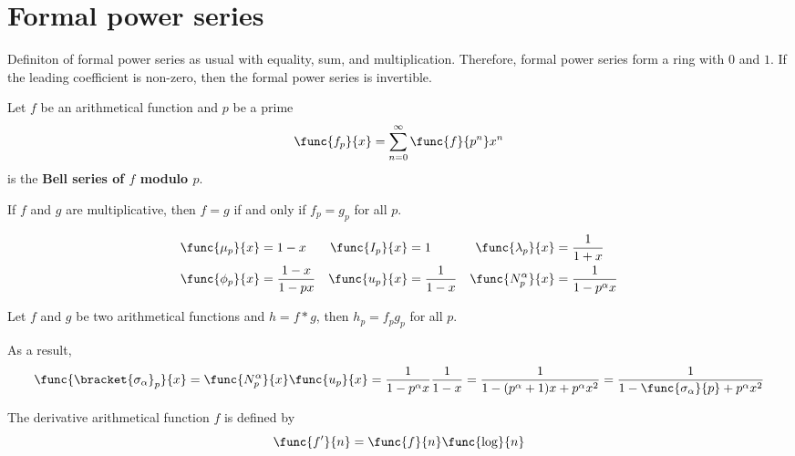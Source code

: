 \section{Formal power series}
Definiton of formal power series as usual with equality, sum, and multiplication. Therefore, formal power series form a ring with \(0\) and \(1\). If the leading coefficient is non-zero, then the formal power series is invertible. 
\begin{definition}
    Let \(f\) be an arithmetical function and \(p\) be a prime 
    \begin{equation*}
        \func{f_p}{x} = \sum_{n = 0}^{\infty} \func{f}{p^n}x^n
    \end{equation*}
    is the \textbf{Bell series of \(f\) modulo \(p\)}.
\end{definition}

\begin{theorem}
    If \(f\) and \(g\) are multiplicative, then \(f = g\) if and only if \(f_p = g_p\) for all \(p\). 
\end{theorem}
\begin{example}
    \begin{align*}
        \func{\mu_p}{x} &= 1-x & \func{I_p}{x} &= 1 & \func{\lambda_p}{x} &= \frac{1}{1 + x}\\
        \func{\phi_p}{x} &= \frac{1-x}{1 - px} & \func{u_p}{x} &= \frac{1}{1 - x} & \func{N^{\alpha}_p}{x} &= \frac{1}{1 - p^{\alpha} x} 
    \end{align*}
\end{example}
\begin{theorem}
    Let \(f\) and \(g\) be two arithmetical functions and \(h = f \ast g\), then \(h_p = f_p g_p\) for all \(p\).
\end{theorem}
As a result, 
\begin{equation*}
    \func{\bracket{\sigma_{\alpha}}_p}{x} = \func{N^{\alpha}_p}{x} \func{u_p}{x} = \frac{1}{1- p^{\alpha}x} \frac{1}{1- x} = \frac{1}{1 - (p^{\alpha} + 1)x + p^{\alpha}x^2} = \frac{1}{1 - \func{\sigma_{\alpha}}{p} + p^{\alpha} x^2}
\end{equation*}

\begin{definition}
    The derivative arithmetical function \(f\) is defined by 
    \begin{equation*}
        \func{f'}{n} = \func{f}{n} \func{\log}{n}
    \end{equation*}
\end{definition}

